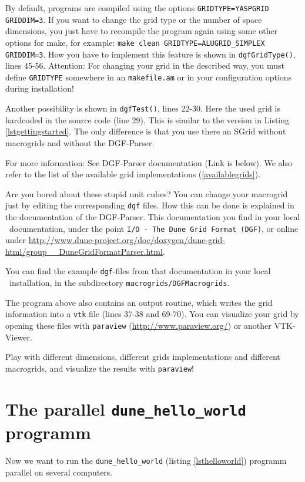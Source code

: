 By default, programs are compiled using the options \lstinline!GRIDTYPE=YASPGRID GRIDDIM=3!. If you want to change the grid type or the number of space dimensions, you just have to recompile the program again using some other options for make, for example: \lstinline!make clean GRIDTYPE=ALUGRID_SIMPLEX GRIDDIM=3!. How you have to implement this feature is shown in \lstinline!dgfGridType()!, lines 45-56.
Attention: For changing your grid in the described way, you must define \lstinline!GRIDTYPE! somewhere in an \lstinline!makefile.am! or in your configuration options during installation!

Another possibility is shown in \lstinline!dgfTest()!, lines 22-30. Here the used grid is hardcoded in the source code (line 29). This is similar to the version in Listing \ref{lstgettingstarted}. The only difference is that you use there an SGrid without macrogrids and without the DGF-Parser.

For more information: See DGF-Parser documentation (Link is below). We also refer to the list of the available grid implementations (\ref{availablegrids}).

Are you bored about these stupid unit cubes? You can change your macrogrid just by editing the corresponding \texttt{dgf} files. How this can be done is explained in the documentation of the DGF-Parser. This documentation you find in your local \Grid\ documentation, under the point \texttt{I/O - The Dune Grid Format (DGF)}, or online under \url{http://www.dune-project.org/doc/doxygen/dune-grid-html/group__DuneGridFormatParser.html}. 

You can find the example \texttt{dgf}-files from that documentation in your local \Fem\ installation, in the subdirectory \texttt{macrogrids/DGFMacrogrids}.

The program above also contains an output routine, which writes the grid information into a \texttt{vtk} file (lines 37-38 and 69-70). You can visualize your grid by opening these files with \texttt{paraview} (\url{http://www.paraview.org/}) or another VTK-Viewer.

\begin{exc}
Play with different dimensions, different grids implementations and different macrogrids, and visualize the results with \texttt{paraview}!
\end{exc}


\section{The parallel \texttt{dune\_hello\_world} programm}\label{parallel}
Now we want to run the \texttt{dune\_hello\_world} (listing \ref{lsthelloworld}) programm parallel on several computers.
\bigskip


